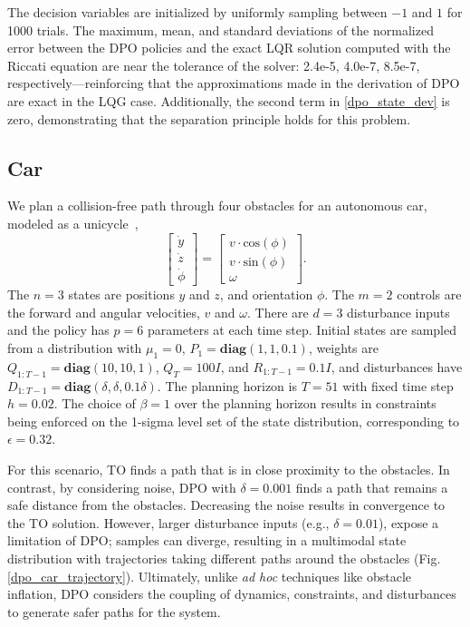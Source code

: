 The decision variables are initialized by uniformly sampling between $-1$ and $1$ for 1000 trials. The maximum, mean, and standard deviations of the normalized error between the DPO policies and the exact LQR solution computed with the Riccati equation are near the tolerance of the solver: 2.4e-5, 4.0e-7, 8.5e-7, respectively---reinforcing that the approximations made in the derivation of DPO are exact in the LQG case. Additionally, the second term in \eqref{dpo_state_dev} is zero, demonstrating that the separation principle holds for this problem.

\subsection{Car}
We plan a collision-free path through four obstacles for an autonomous car, modeled as a unicycle~\cite{lavalle2006planning},
\begin{equation}
	\begin{bmatrix} \dot{y} \\ \dot{z} \\ \dot{\phi} \end{bmatrix} = \begin{bmatrix} v \cdot \text{cos}(\phi) \\ v \cdot \text{sin}(\phi) \\ \omega \end{bmatrix}. \label{dpo_unicycle_dynamics}
\end{equation}
The $n = 3$ states are positions $y$ and $z$, and orientation $\phi$. The $m = 2$ controls are the forward and angular velocities, $v$ and $\omega$. There are $d = 3$ disturbance inputs and the policy has $p = 6$ parameters at each time step. Initial states are sampled from a distribution with $\mu_1 = 0$, $P_1 = \textbf{diag}(1,1,0.1)$, weights are $Q_{1:T-1} = \textbf{diag}(10,10,1)$, $Q_T = 100I$, and $R_{1:T-1} = 0.1I$, and disturbances have $D_{1:T-1} = \textbf{diag}(\delta, \delta, 0.1\delta)$. The planning horizon is $T = 51$ with fixed time step $h = 0.02$. The choice of $\beta = 1$ over the planning horizon results in constraints being enforced on the 1-sigma level set of the state distribution, corresponding to $\epsilon = 0.32$.

For this scenario, TO finds a path that is in close proximity to the obstacles. In contrast, by considering noise, DPO with $\delta = 0.001$ finds a path that remains a safe distance from the obstacles. Decreasing the noise results in convergence to the TO solution. However, larger disturbance inputs (e.g., $\delta = 0.01$), expose a limitation of DPO;  samples can diverge, resulting in a multimodal state distribution with trajectories taking different paths around the obstacles (Fig. \ref{dpo_car_trajectory}). Ultimately, unlike \textit{ad hoc} techniques like obstacle inflation, DPO considers the coupling of dynamics, constraints, and disturbances to generate safer paths for the system.

